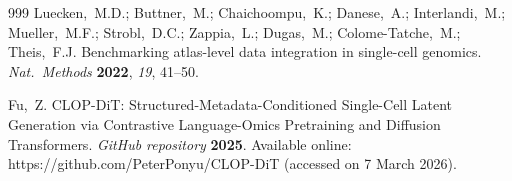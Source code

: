 \documentclass[preprint,12pt]{elsarticle}
\begin{document}
\begin{thebibliography}{999}
Luecken,~M.D.; Buttner,~M.; Chaichoompu,~K.; Danese,~A.; Interlandi,~M.; Mueller,~M.F.; Strobl,~D.C.; Zappia,~L.; Dugas,~M.; Colome-Tatche,~M.; Theis,~F.J. Benchmarking atlas-level data integration in single-cell genomics. {\em Nat.\ Methods} {\bf 2022}, {\em 19}, 41--50.

Fu,~Z. CLOP-DiT: Structured-Metadata-Conditioned Single-Cell Latent Generation via Contrastive Language-Omics Pretraining and Diffusion Transformers. {\em GitHub repository} {\bf 2025}. Available online: https://github.com/PeterPonyu/CLOP-DiT (accessed on 7 March 2026).

\end{thebibliography}
\end{document}
